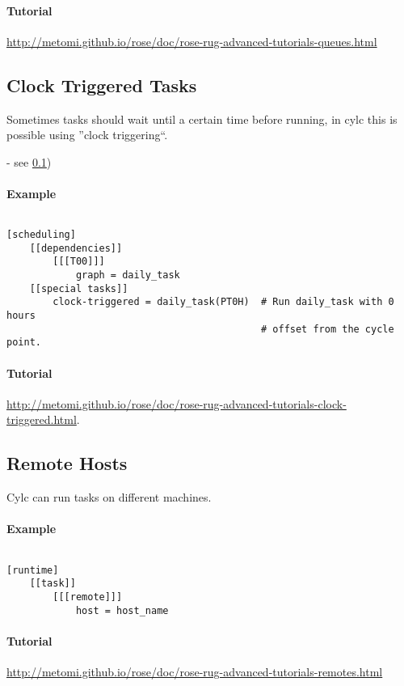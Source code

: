 \paragraph*{Tutorial}
\url{http://metomi.github.io/rose/doc/rose-rug-advanced-tutorials-queues.html}


\subsection{Clock Triggered Tasks}
\label{Clock Triggered Tasks}

Sometimes tasks should wait until a certain time before running, in cylc this
is possible using ''clock triggering``.


- see \ref{Clock Triggered Tasks}) 
\paragraph*{Example} $ $

\begin{lstlisting}
[scheduling]
    [[dependencies]]
        [[[T00]]]
            graph = daily_task
    [[special tasks]]
        clock-triggered = daily_task(PT0H)  # Run daily_task with 0 hours
                                            # offset from the cycle point.
\end{lstlisting}

\paragraph*{Tutorial}
\url{http://metomi.github.io/rose/doc/rose-rug-advanced-tutorials-clock-triggered.html}.


\subsection{Remote Hosts}

Cylc can run tasks on different machines.

\paragraph*{Example} $ $

\begin{lstlisting}
[runtime]
    [[task]]
        [[[remote]]]
            host = host_name
\end{lstlisting}

\paragraph*{Tutorial}
\url{http://metomi.github.io/rose/doc/rose-rug-advanced-tutorials-remotes.html}
